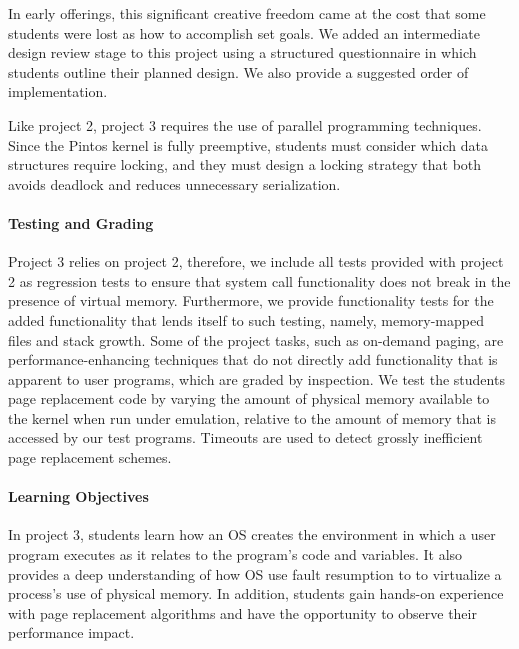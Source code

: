 In early offerings, this significant creative freedom came at the cost that 
some students were lost as how to accomplish set goals.  We added an intermediate
design review stage to this project using a structured questionnaire in which students 
outline their planned design.  We also provide a suggested order of implementation.

Like project 2, project 3 requires the use of parallel programming techniques.  
Since the Pintos kernel is fully preemptive, students must consider which data structures
require locking, and they must design a locking strategy that both avoids deadlock
and reduces unnecessary serialization.

\paragraph{Testing and Grading}
Project 3 relies on project 2, therefore, we include all tests provided with project 2
as regression tests to ensure that system call functionality does not break in the
presence of virtual memory.  Furthermore, we provide functionality tests for the
added functionality that lends itself to such testing, namely, memory-mapped files
and stack growth.  Some of the project tasks, such as on-demand paging, are 
performance-enhancing techniques that do not directly add functionality that is
apparent to user programs, which are graded by inspection.  We test the students
page replacement code by varying the amount of physical memory available to
the kernel when run under emulation, relative to the amount of memory that is 
accessed by our test programs.  Timeouts are used to detect grossly inefficient 
page replacement schemes.

\paragraph{Learning Objectives}
In project 3, students learn how an OS creates the environment in which a user
program executes as it relates to the program's code and variables.
It also provides a deep understanding of how OS use fault resumption to
to virtualize a process's use of physical memory.
In addition, students gain hands-on experience with page replacement algorithms
and have the opportunity to observe their performance impact.

%
%
%
